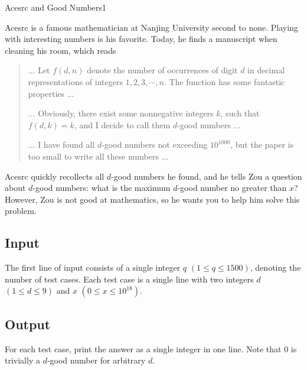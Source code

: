 \begin{Problem}{Acesrc and Good Numbers}{1}

Acesrc is a famous mathematician at Nanjing University second to none. Playing with interesting numbers is his favorite. Today, he finds a manuscript when cleaning his room, which reads

\begin{quote}
... Let $f(d, n)$ denote the number of occurrences of digit $d$ in decimal representations of integers $1, 2, 3, \cdots, n$. The function has some fantastic properties ...

... Obviously, there exist some nonnegative integers $k$, such that $f(d, k) = k$, and I decide to call them $d$-good numbers ...

... I have found all $d$-good numbers not exceeding $10^{1000}$, but the paper is too small to write all these numbers ...
\end{quote}

Acesrc quickly recollects all $d$-good numbers he found, and he tells Zou a question about $d$-good numbers: what is the maximum $d$-good number no greater than $x$? However, Zou is not good at mathematics, so he wants you to help him solve this problem.

\subsection*{Input}

The first line of input consists of a single integer $q$ $(1 \leq q \leq 1500)$, denoting the number of test cases. Each test case is a single line with two integers $d$ $(1 \leq d \leq 9)$ and $x$ $(0 \leq x \leq 10^{18})$.

\subsection*{Output}

For each test case, print the answer as a single integer in one line. Note that $0$ is trivially a $d$-good number for arbitrary $d$.


\end{Problem}
